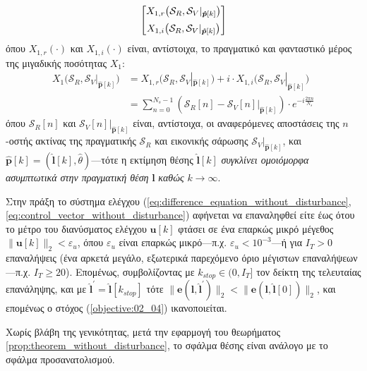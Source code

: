 \begin{bw_box}
\begin{theorem}
\begin{align}
\begin{bmatrix}
      X_{1,r}\big(\mathcal{S}_R, \mathcal{S}_V|_{\bm{\hat{p}}[k]}\big) \vspace{0.2cm} \\
      X_{1,i}\big(\mathcal{S}_R, \mathcal{S}_V|_{\bm{\hat{p}}[k]}\big)
    \end{bmatrix}
    \label{eq:control_vector_without_disturbance}
  \end{align}
  όπου $X_{1,r}(\cdot)$ και $X_{1,i}(\cdot)$ είναι, αντίστοιχα, το πραγματικό
  και φανταστικό μέρος της μιγαδικής ποσότητας $X_1$:
  \begin{align}
    X_1\big(\mathcal{S}_R, \mathcal{S}_V|_{\bm{\hat{p}}[k]}\big) &= X_{1,r}\big(\mathcal{S}_R, \mathcal{S}_V|_{\bm{\hat{p}}[k]}\big)
      + i \cdot X_{1,i}\big(\mathcal{S}_R, \mathcal{S}_V|_{\bm{\hat{p}}[k]}\big) \nonumber \\
      &= \sum\limits_{n=0}^{N_s-1}(\mathcal{S}_R[n] - \mathcal{S}_V[n]|_{\bm{\hat{p}}[k]}) \cdot e^{-i \frac{2 \pi n}{N_s}} \label{eq:X1}
  \end{align}
  όπου $\mathcal{S}_R[n]$ και $\mathcal{S}_V[n]|_{\bm{\hat{p}}[k]}$ είναι,
  αντίστοιχα, οι αναφερόμενες αποστάσεις της $n$-οστής ακτίνας της πραγματικής
  $\mathcal{S}_R$ και εικονικής σάρωσης $\mathcal{S}_V|_{\bm{\hat{p}}[k]}$, και
  $\hat{\bm{p}}[k] = (\hat{\bm{l}}[k], \hat{\theta})$---τότε η εκτίμηση θέσης
  $\hat{\bm{l}}[k]$ \textit{συγκλίνει ομοιόμορφα ασυμπτωτικά στην πραγματική
  θέση} $\bm{l}$ \textit{καθώς} $k \rightarrow \infty$.
\end{theorem}
\end{bw_box}

Στην πράξη το σύστημα ελέγχου
(\ref{eq:difference_equation_without_disturbance},
\ref{eq:control_vector_without_disturbance}) αφήνεται να επαναληφθεί είτε
έως ότου το μέτρο του διανύσματος ελέγχου $\bm{u}[k]$ φτάσει σε ένα επαρκώς
μικρό μέγεθος $\|\bm{u}[k]\|_2 < \varepsilon_u$, όπου $\varepsilon_u$ είναι
επαρκώς μικρό---π.χ. $\varepsilon_u < 10^{-3}$---ή για $I_T > 0$ επαναλήψεις
(ένα αρκετά μεγάλο, εξωτερικά παρεχόμενο όριο μέγιστων επαναλήψεων---π.χ. $I_T
\geq 20$). Επομένως, συμβολίζοντας με $k_{stop} \in (0, I_T]$ τον δείκτη
της τελευταίας επανάληψης, και με
$\hat{\bm{l}}^{\prime} = \hat{\bm{l}}[k_{stop}]$ τότε
$\|\bm{e}(\bm{l}, \hat{\bm{l}}^{\prime})\|_2 < \|\bm{e}(\bm{l}, \hat{\bm{l}}[0])\|_2$,
και επομένως ο στόχος (\ref{objective:02_04}) ικανοποιείται.

\begin{gg_box}
\begin{remark}
  \label{remark:loc_prop_or}
  Χωρίς βλάβη της γενικότητας, μετά την εφαρμογή του θεωρήματος
  \ref{prop:theorem_without_disturbance}, το σφάλμα θέσης είναι ανάλογο με το
  σφάλμα προσανατολισμού.
\end{remark}
\end{gg_box}

